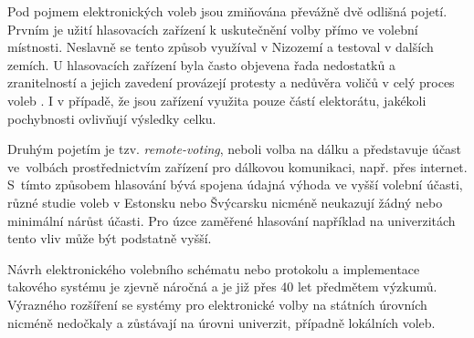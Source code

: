 Pod pojmem elektronických voleb jsou zmiňována převážně dvě odlišná pojetí. Prvním je užití hlasovacích zařízení k uskutečnění volby přímo ve volební místnosti. Neslavně se tento způsob využíval v Nizozemí \cite{GoldsmithCaseSR} a testoval v dalších zemích. U hlasovacích zařízení byla často objevena řada nedostatků a zranitelností a jejich zavedení provázejí protesty a nedůvěra voličů v celý proces voleb \cite{Valasek2020}. I v případě, že jsou zařízení využita pouze částí elektorátu, jakékoli pochybnosti ovlivňují výsledky celku.

Druhým pojetím je tzv. \textit{remote-voting}, neboli volba na dálku a představuje účast ve~volbách prostřednictvím zařízení  pro dálkovou komunikaci, např. přes internet. S~tímto způsobem hlasování bývá spojena údajná výhoda ve vyšší volební účasti, různé studie voleb v Estonsku \cite{estoniaTurnout} nebo Švýcarsku \cite{swissTurnout} nicméně neukazují žádný nebo minimální nárůst účasti. Pro úzce zaměřené hlasování například na univerzitách tento vliv může být podstatně vyšší.

Návrh elektronického volebního schématu nebo protokolu a implementace takového systému je zjevně náročná a je již přes 40 let předmětem výzkumů. Výrazného rozšíření se systémy pro elektronické volby na státních úrovních nicméně nedočkaly a zůstávají na úrovni univerzit, případně lokálních voleb.

